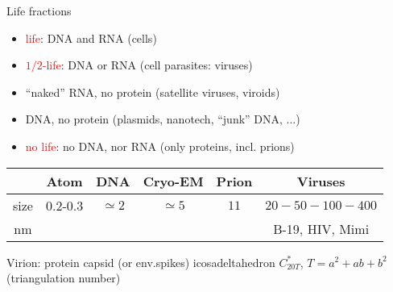 \documentclass[%
pdf,
colorBG,
slideColor,
]{prosper}
\begin{document}
\begin{slide}{Life fractions}
\begin{itemize}
\item \textcolor{red}{life}: DNA and RNA (cells)
\item \textcolor{red}{$1/2$-life}: DNA or RNA (cell parasites: viruses)
\item ``naked'' RNA, no protein (satellite viruses, viroids)
\item  DNA, no protein (plasmids, nanotech, ``junk'' DNA, ...)
\item \textcolor{red}{no life}: no DNA, nor RNA  (only proteins, incl. prions)
\end{itemize}
{\small
\begin{tabular}{c|c|c|c|c|c}
          &Atom   &DNA        &Cryo-EM    &Prion  &Viruses\\
\hline
size  &0.2-0.3 &$\simeq 2$&$\simeq 5$ &$11$   &$20-50-100-400$\\
nm   &        &          &           &       &B-19,  HIV, Mimi
\end{tabular}
}
Virion: protein capsid (or env.spikes) icosadeltahedron
$C_{20T}^*$, $T=a^2+ab+b^2$ (triangulation number)

\end{slide}
\end{document}

